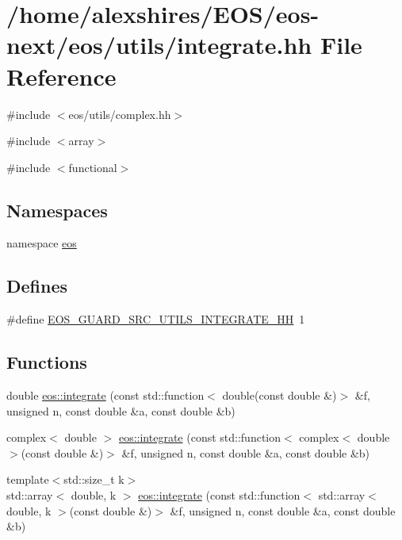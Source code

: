 \hypertarget{integrate_8hh}{
\section{/home/alexshires/EOS/eos-\/next/eos/utils/integrate.hh File Reference}
\label{integrate_8hh}
}
{\ttfamily \#include $<$eos/utils/complex.hh$>$}\par
{\ttfamily \#include $<$array$>$}\par
{\ttfamily \#include $<$functional$>$}\par
\subsection*{Namespaces}
\begin{DoxyCompactItemize}
\item 
namespace \hyperlink{namespaceeos}{eos}
\end{DoxyCompactItemize}
\subsection*{Defines}
\begin{DoxyCompactItemize}
\item 
\#define \hyperlink{integrate_8hh_a28127b2219a727be4200765c82be7495}{EOS\_\-GUARD\_\-SRC\_\-UTILS\_\-INTEGRATE\_\-HH}~1
\end{DoxyCompactItemize}
\subsection*{Functions}
\begin{Indent}{\bf }\par
{\em \label{_amgrpd41d8cd98f00b204e9800998ecf8427e}
 }\begin{DoxyCompactItemize}
\item 
double \hyperlink{namespaceeos_ae905f169a81a2dd54d1116bc201ad41a}{eos::integrate} (const std::function$<$ double(const double \&)$>$ \&f, unsigned n, const double \&a, const double \&b)
\item 
complex$<$ double $>$ \hyperlink{namespaceeos_ac60718e2ad5504caf40d52f07a86607d}{eos::integrate} (const std::function$<$ complex$<$ double $>$(const double \&)$>$ \&f, unsigned n, const double \&a, const double \&b)
\item 
{\footnotesize template$<$std::size\_\-t k$>$ }\\std::array$<$ double, k $>$ \hyperlink{namespaceeos_aa97e022b32760a5d657bc35b9151efb8}{eos::integrate} (const std::function$<$ std::array$<$ double, k $>$(const double \&)$>$ \&f, unsigned n, const double \&a, const double \&b)
\end{DoxyCompactItemize}
\end{Indent}


